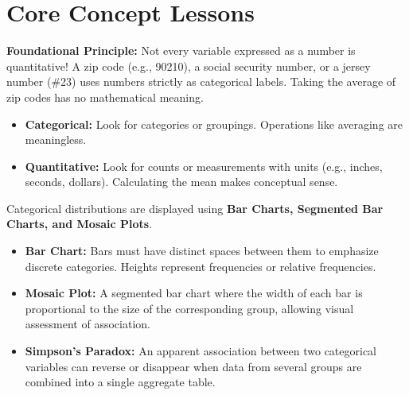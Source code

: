 \section{Core Concept Lessons}

\begin{lessonbox}
\textbf{Foundational Principle:} Not every variable expressed as a number is quantitative! A zip code (e.g., 90210), a social security number, or a jersey number (\#23) uses numbers strictly as categorical labels. Taking the average of zip codes has no mathematical meaning.
\begin{itemize}[leftmargin=1.2em]
  \item \textbf{Categorical:} Look for categories or groupings. Operations like averaging are meaningless.
  \item \textbf{Quantitative:} Look for counts or measurements with units (e.g., inches, seconds, dollars). Calculating the mean makes conceptual sense.
\end{itemize}
\end{lessonbox}

\begin{lessonbox}
Categorical distributions are displayed using \textbf{Bar Charts, Segmented Bar Charts, and Mosaic Plots}.
\begin{itemize}[leftmargin=1.2em]
  \item \textbf{Bar Chart:} Bars must have distinct spaces between them to emphasize discrete categories. Heights represent frequencies or relative frequencies.
  \item \textbf{Mosaic Plot:} A segmented bar chart where the width of each bar is proportional to the size of the corresponding group, allowing visual assessment of association.
  \item \textbf{Simpson's Paradox:} An apparent association between two categorical variables can reverse or disappear when data from several groups are combined into a single aggregate table.
\end{itemize}
\end{lessonbox}

